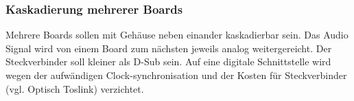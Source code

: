 \subsubsection{Kaskadierung mehrerer Boards}
\label{sec:Konzept_Kaskadierung}

Mehrere Boards sollen mit Gehäuse neben einander kaskadierbar sein. 
Das Audio Signal wird von einem Board zum nächsten jeweils analog weitergereicht. 
Der Steckverbinder soll kleiner als D-Sub sein. 
Auf eine digitale Schnittstelle wird wegen der aufwändigen Clock-synchronisation und der Kosten für Steckverbinder (vgl. Optisch Toslink) verzichtet.


